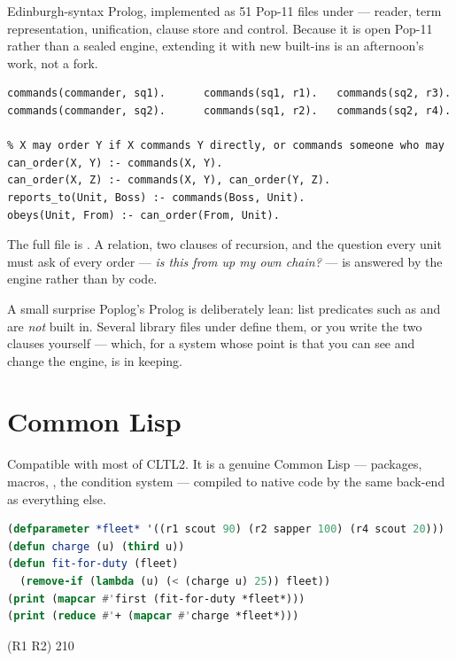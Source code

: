 Edinburgh-syntax Prolog, implemented as 51 Pop-11 files under
 --- reader, term representation, unification, clause
store and control. Because it is open Pop-11 rather than a sealed engine,
extending it with new built-ins is an afternoon's work, not a fork.

\begin{lstlisting}[language=PrologX]
commands(commander, sq1).      commands(sq1, r1).   commands(sq2, r3).
commands(commander, sq2).      commands(sq1, r2).   commands(sq2, r4).

% X may order Y if X commands Y directly, or commands someone who may
can_order(X, Y) :- commands(X, Y).
can_order(X, Z) :- commands(X, Y), can_order(Y, Z).
reports_to(Unit, Boss) :- commands(Boss, Unit).
obeys(Unit, From) :- can_order(From, Unit).
\end{lstlisting}


The full file is . A relation, two clauses of recursion, and
the question every unit must ask of every order --- \emph{is this from up my
own chain?} --- is answered by the engine rather than by code.

\begin{callout}{A small surprise}
Poplog's Prolog is deliberately lean: list predicates such as
 and  are \emph{not} built in. Several library
files under  define them, or you write the two clauses
yourself --- which, for a system whose point is that you can see and change
the engine, is in keeping.
\end{callout}

\section{Common Lisp}

Compatible with most of CLTL2. It is a genuine Common Lisp --- packages,
macros, , the condition system --- compiled to native code by
the same back-end as everything else.

\begin{lstlisting}[language=Lisp]
(defparameter *fleet* '((r1 scout 90) (r2 sapper 100) (r4 scout 20)))
(defun charge (u) (third u))
(defun fit-for-duty (fleet)
  (remove-if (lambda (u) (< (charge u) 25)) fleet))
(print (mapcar #'first (fit-for-duty *fleet*)))
(print (reduce #'+ (mapcar #'charge *fleet*)))
\end{lstlisting}
\begin{repl}
(R1 R2)
210
\end{repl}

